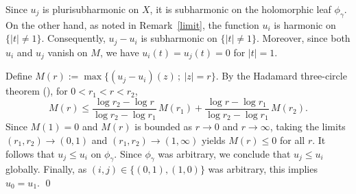 \documentclass[a4paper, 12pt]{article}
\begin{document}
Since $u_j$ is plurisubharmonic on $X$, it is subharmonic on the holomorphic leaf $\phi_\gamma$.
On the other hand, as noted in Remark~\ref{limit}, the function $u_i$ is harmonic
on $\{|t|\neq 1\}$.
Consequently, $u_j-u_i$ is subharmonic on $\{|t|\neq 1\}$.
Moreover, since both $u_i$ and $u_j$ vanish on $M$, we have $u_i(t)=u_j(t)=0$ for $|t|=1$.

Define $M(r):=\max\{(u_j-u_i)(z)\,;\ |z|=r\}$. By the Hadamard three-circle theorem
(\cite[Chapter~2, Theorem~28]{PW67}), for $0<r_1<r<r_2$,
\[
M(r)\le
\frac{\log r_2-\log r}{\log r_2-\log r_1}\,M(r_1)
+\frac{\log r-\log r_1}{\log r_2-\log r_1}\,M(r_2).
\]
Since $M(1)=0$ and $M(r)$ is bounded as $r\to0$ and $r\to\infty$, taking the limits
$(r_1,r_2)\to(0,1)$ and $(r_1,r_2)\to(1,\infty)$ yields $M(r)\le 0$ for all $r$.
It follows that $u_j \le u_i$ on $\phi_\gamma$. Since $\phi_\gamma$ was arbitrary, we conclude that $u_j \le u_i$ globally.
Finally, as $(i,j)\in\{(0,1),(1,0)\}$ was arbitrary, this implies $u_0 = u_1$. \qed
\end{document}
